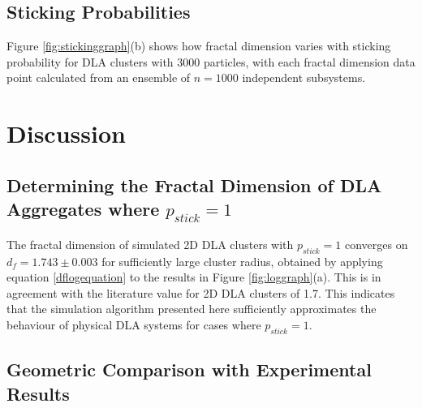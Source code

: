 \documentclass[11pt]{iopart}
\begin{document}
\subsection{Sticking Probabilities}
Figure \ref{fig:stickinggraph}(b) shows how fractal dimension varies with sticking probability for DLA clusters with 3000 particles, with each fractal dimension data point calculated from an ensemble of $n=1000$ independent subsystems.

\section{Discussion}
\subsection{Determining the Fractal Dimension of DLA Aggregates where $p_{stick} = 1$}

The fractal dimension of simulated 2D DLA clusters with $p_{stick} = 1$ converges on $d_f = 1.743 \pm 0.003$ for sufficiently large cluster radius, obtained by applying equation \ref{dflogequation} to the results in Figure \ref{fig:loggraph}(a). This is in agreement with the literature value for 2D DLA clusters of 1.7\cite{fractalindexref}. This indicates that the simulation algorithm presented here sufficiently approximates the behaviour of physical DLA systems for cases where $p_{stick} = 1$.

\subsection{Geometric Comparison with Experimental Results}
\end{document}
